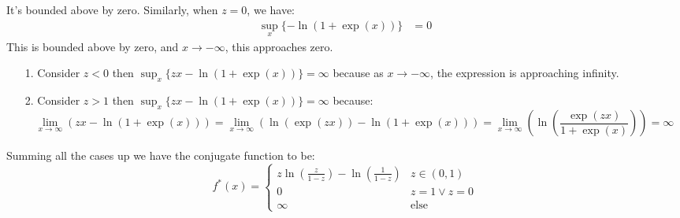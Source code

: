 \documentclass[]{article}
\begin{document}
        It's bounded above by zero. 
        Similarly, when $z = 0$, we have: 
        \begin{align*}\tag{1d4}\label{eqn:1d4}
            \sup_x \{-\ln(1 + \exp(x))\} & = 0
        \end{align*}
        This is bounded above by zero, and $x\rightarrow-\infty$, this approaches zero. 
        \begin{enumerate}
        \item[1.] Consider $z < 0$ then $\sup_x\{zx - \ln(1 + \exp(x))\} = \infty$ because as $x\rightarrow -\infty$, the expression is approaching infinity. 
        \item[2.] Consider $z > 1$ then $\sup_x\{zx - \ln(1 + \exp(x))\} = \infty$ because: 
        \begin{equation*}\tag{1d5}\label{eqn:1d5}
            \lim_{x\rightarrow\infty}
            \left(
                zx - \ln(1 + \exp(x))
            \right)
            =
            \lim_{x\rightarrow\infty}
            \left(
                \ln(\exp(zx)) - \ln(1 + \exp(x))
            \right)
            =
            \lim_{x\rightarrow\infty}
            \left(
                \ln
                \left(
                    \frac{\exp(zx)}{1 + \exp(x)}
                \right)
            \right) = \infty
        \end{equation*} 
        \end{enumerate}
        Summing all the cases up we have the conjugate function to be: 
        \begin{equation*}\tag{1d6}\label{eqn:1d6}
            f^*(x) = 
            \begin{cases}
                z \ln \left(
                    \frac{z}{1 - z}
                \right)
                -
                \ln \left(
                    \frac{1}{1 - z} 
                \right) & z \in (0, 1)
                \\
                0 & z = 1 \vee z = 0
                \\
                \infty & \text{else}
            \end{cases}
        \end{equation*}
        
\end{document}
